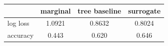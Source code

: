 \begin{tabular}{lccc}
\toprule
 & marginal & tree baseline & surrogate \\
\midrule
log loss & 1.0921 & 0.8632 & 0.8024 \\
accuracy & 0.443 & 0.620 & 0.646 \\
\bottomrule
\end{tabular}
